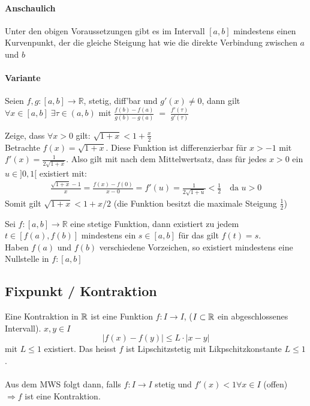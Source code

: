 \documentclass[a4paper]{article}
\begin{document}
			\paragraph{Anschaulich} Unter den obigen Voraussetzungen gibt es im Intervall $[a,b]$ mindestens einen Kurvenpunkt, der die gleiche Steigung hat wie
			die direkte Verbindung zwischen $a$ und $b$\\
				\vspace{-7mm}
			\paragraph{Variante} Seien $f, g : [a,b] \to \mathbb{R}$, stetig, diff'bar und $g'(x) \ne 0$, dann gilt\\
					$\forall x \in [a,b] \; \exists \tau \in (a,b)$ mit $\frac{f(b) - f(a)}{g(b) - g(a)} \; = \; \frac{f'(\tau)}{g'(\tau)}$
		\begin{fmerke}
			Zeige, dass $\forall x > 0$ gilt: $\sqrt{1+x}< 1 + \frac{x}{2}$\\
			Betrachte $f(x) = \sqrt{1+x}$. Diese Funktion ist differenzierbar für $x>-1$ mit $f'(x) = \frac{1}{2 \sqrt{1+x}}$. Also gilt mit nach dem Mittelwertsatz, dass für jedes $x>0$ ein $u \in ]0,1[$ existiert mit:
			\begin{align*}
				\frac{\sqrt{1+x}-1}{x} = 
				\frac{f(x)-f(0)}{x-0} = f'(u) = \frac{1}{2 \sqrt{1+u}} < \frac{1}{2} \quad \text{da } u>0
			\end{align*}
			Somit gilt $\sqrt{1+x} < 1 + x/2$ (die Funktion besitzt die maximale Steigung $\frac{1}{2}$)
		\end{fmerke}

		\begin{fsatz}[Zwischenwertsatz]
			Sei $f: [a,b] \to \mathbb{R}$ eine stetige Funktion, dann existiert zu jedem $t \in [f(a), f(b)]$ mindestens ein $s \in [a,b]$ für das gilt $f(t) = s$.\\
			Haben $f(a)$ und $f(b)$ verschiedene Vorzeichen, so existiert mindestens eine Nullstelle in $f: [a,b]$
		\end{fsatz}
	\subsection{Fixpunkt / Kontraktion}
		\begin{fdef}[Kontraktion]
			Eine Kontraktion in $\mathbb{R}$ ist eine Funktion $f: I \rightarrow I$, ($I \subset \mathbb{R}$  ein abgeschlossenes Intervall). $x,y \in I$
			$$ |f(x)-f(y)| \leq L \cdot |x-y|$$
			mit $L \leq 1 $ existiert. Das heisst $f$ ist Lipschitzstetig mit Likpschitzkonstante $L\leq 1$.\\
			\\
			Aus dem MWS folgt dann, falls $f:I \longrightarrow I$ stetig und $f'(x) < 1 \forall x \in I$ (offen) 
			$\Longrightarrow f$ ist eine Kontraktion.
			
		\end{fdef}
\end{document}
